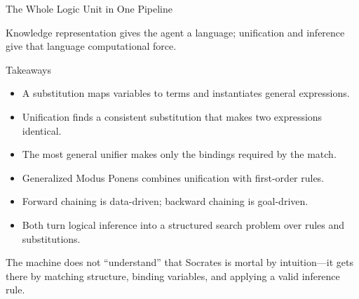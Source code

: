 \documentclass[aspectratio=169,10pt]{beamer}
\begin{document}
\begin{frame}[shrink=10]{The Whole Logic Unit in One Pipeline}
  \begin{center}
  \end{center}

  \begin{keyidea}
    Knowledge representation gives the agent a language; unification and inference give that language computational force.
  \end{keyidea}
\end{frame}

\begin{frame}[shrink=10]{Takeaways}
  \begin{itemize}
    \item A substitution maps variables to terms and instantiates general expressions.
    \item Unification finds a consistent substitution that makes two expressions identical.
    \item The most general unifier makes only the bindings required by the match.
    \item Generalized Modus Ponens combines unification with first-order rules.
    \item Forward chaining is data-driven; backward chaining is goal-driven.
    \item Both turn logical inference into a structured search problem over rules and substitutions.
  \end{itemize}

  \begin{keyidea}
    The machine does not ``understand'' that Socrates is mortal by intuition---it gets there by matching structure, binding variables, and applying a valid inference rule.
  \end{keyidea}
\end{frame}
\end{document}
